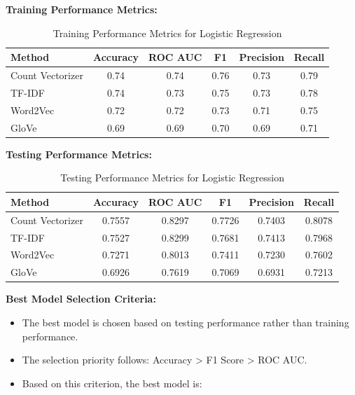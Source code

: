 \textbf{Training Performance Metrics:}

\begin{table}[H]
    \centering
    \caption{Training Performance Metrics for Logistic Regression}
    \label{tab:lr-training-metrics}
    \begin{tabular}{|l|c|c|c|c|c|}
        \hline
        \textbf{Method} & \textbf{Accuracy} & \textbf{ROC AUC} & \textbf{F1} & \textbf{Precision} & \textbf{Recall} \\ 
        \hline
        Count Vectorizer & 0.74 & 0.74 & 0.76 & 0.73 & 0.79 \\ 
        \hline
        TF-IDF & 0.74 & 0.73 & 0.75 & 0.73 & 0.78 \\ 
        \hline
        Word2Vec & 0.72 & 0.72 & 0.73 & 0.71 & 0.75 \\ 
        \hline
        GloVe & 0.69 & 0.69 & 0.70 & 0.69 & 0.71 \\ 
        \hline
    \end{tabular}
\end{table}

\newpage

\textbf{Testing Performance Metrics:}

\begin{table}[H]
    \centering
    \caption{Testing Performance Metrics for Logistic Regression}
    \label{tab:lr-testing-metrics}
    \begin{tabular}{|l|c|c|c|c|c|}
        \hline
        \textbf{Method} & \textbf{Accuracy} & \textbf{ROC AUC} & \textbf{F1} & \textbf{Precision} & \textbf{Recall} \\ 
        \hline
        Count Vectorizer & 0.7557 & 0.8297 & 0.7726 & 0.7403 & 0.8078 \\ 
        \hline
        TF-IDF & 0.7527 & 0.8299 & 0.7681 & 0.7413 & 0.7968 \\ 
        \hline
        Word2Vec & 0.7271 & 0.8013 & 0.7411 & 0.7230 & 0.7602 \\ 
        \hline
        GloVe & 0.6926 & 0.7619 & 0.7069 & 0.6931 & 0.7213 \\ 
        \hline
    \end{tabular}
\end{table}

\textbf{Best Model Selection Criteria:}

\begin{itemize}
    \item The best model is chosen based on testing performance rather than training performance.
    \item The selection priority follows: Accuracy > F1 Score > ROC AUC.
    \item Based on this criterion, the best model is:
\end{itemize}

